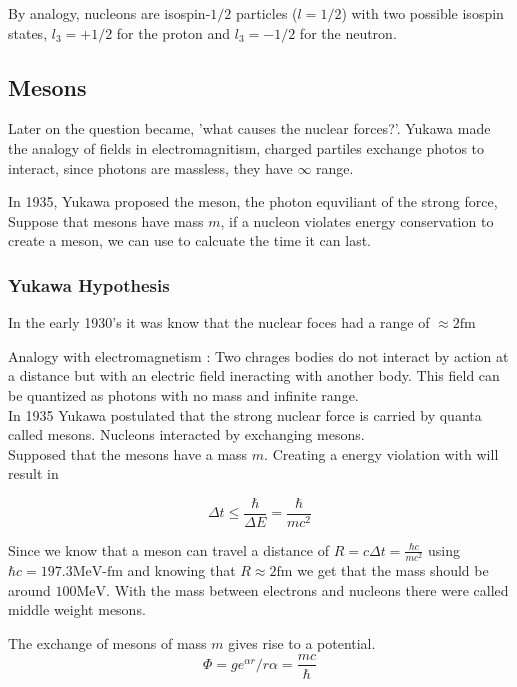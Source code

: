 \documentclass[english, 11pt]{article}
\begin{document}
      \begin{defn}\label{isospin}
        By analogy, nucleons are isospin-$1/2$ particles ($l=1/2$) with two possible isospin states, $l_3=+1/2$ for the proton and $l_3 = -1/2$ for the neutron.
      \end{defn}

      \subsection{Mesons}

      Later on the question became, 'what causes the nuclear forces?'. Yukawa made the analogy of fields in electromagnitism, charged partiles exchange photos to interact, since photons are massless, they have $\infty$ range. 

      In 1935, Yukawa proposed the meson, the photon equviliant of the strong force, Suppose that mesons have mass $m$, if a nucleon violates energy conservation to create a meson, we can use  to calcuate the time it can last.

      \subsubsection{Yukawa Hypothesis}
      In the early 1930's it was know that the nuclear foces had a range of $\approx 2\text{fm}$ 

      Analogy with electromagnetism : Two chrages bodies do not interact by action at a distance but with an electric field ineracting with another body. This field can be quantized as photons with no mass and infinite range.\\
      In 1935 Yukawa postulated that the strong nuclear force is carried by quanta called mesons. Nucleons interacted by exchanging mesons.\\
      Supposed that the mesons have a mass $m$. Creating a energy violation with  will result in 

      \[ \Delta t \le \frac{\hbar}{\Delta E} = \frac{\hbar}{mc^2}\]

      Since we know that a meson can travel a distance of $R = c\Delta t = \frac{\hbar c}{mc^2}$ using $\hbar c = 197.3 \text{MeV-fm}$ and knowing that $R \approx 2 \text{fm}$ we get that the mass should be around $100 \text{MeV}$. With the mass between electrons and nucleons there were called middle weight mesons.

      \begin{defn}\label{yp}
        The exchange of mesons of mass $m$ gives rise to a potential.
        \[ \Phi = ge^{\alpha r}/r \alpha = \frac{mc}{\hbar} \]
      \end{defn}
\end{document}
